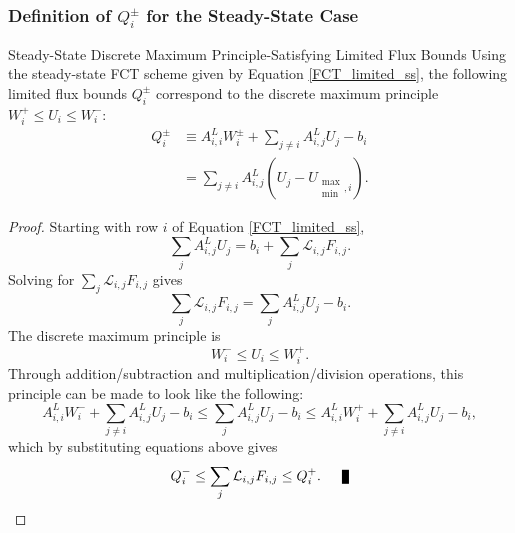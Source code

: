\subsubsection{Definition of $Q_i^\pm$ for the Steady-State Case}
\begin{theorem}{Steady-State Discrete Maximum Principle-Satisfying Limited
  Flux Bounds}
   Using the steady-state FCT scheme given by Equation \eqref{FCT_limited_ss},
   the following limited flux bounds $Q_i^\pm$ correspond to the discrete
   maximum principle $W_i^+\le U_i\le W_i^-$:
   \begin{equation}
   \begin{split}
      Q_i^\pm & \equiv A_{i,i}^L W_i^\pm + \sum\limits_{j\ne i} A_{i,j}^L U_j - b_i\\
      & = \sum\limits_{j\ne i}A_{i,j}^L(U_j - U_{\substack{\max\\\min},i}).
   \end{split}
   \end{equation}
\end{theorem}

\begin{proof}
   Starting with row $i$ of Equation \eqref{FCT_limited_ss},
   \[
      \sum\limits_j A_{i,j}^L U_j
      = b_i + \sum\limits_j\mathcal{L}_{i,j}F_{i,j}.
   \]
   Solving for $\sum\limits_j\mathcal{L}_{i,j}F_{i,j}$ gives
   \[
      \sum\limits_j\mathcal{L}_{i,j}F_{i,j} =
      \sum\limits_j A_{i,j}^L U_j
      - b_i.
   \]
   The discrete maximum principle is
   \[
      W_i^-\le U_i\le W_i^+.
   \]
   Through addition/subtraction and multiplication/division operations, this
   principle can be made to look like the following:
   \[
   A_{i,i}^L W_i^- + \sum\limits_{j\ne i} A_{i,j}^L U_j - b_i
   \le \sum\limits_j A_{i,j}^L U_j - b_i
   \le A_{i,i}^L W_i^+ + \sum\limits_{j\ne i} A_{i,j}^L U_j - b_i,
   \]
   which by substituting equations above gives
   \[
      Q_i^-\le\sum\limits_j \mathcal{L}_{i,j}F_{i,j}\le Q_i^+.\qed
   \]
\end{proof}